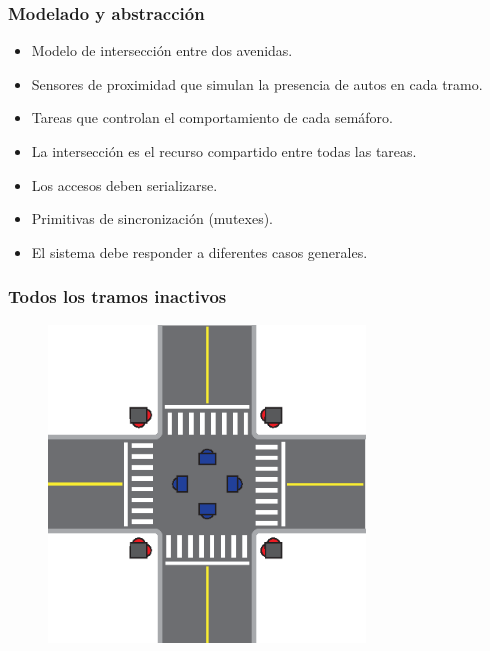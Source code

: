 \begin{frame}
\frametitle{Modelado y abstracción}
\begin{block}{}
	\begin{itemize}
		\item Modelo de intersección entre dos avenidas.
		\item Sensores de proximidad que simulan la presencia de autos en cada tramo.
		\item Tareas que controlan el comportamiento de cada semáforo.
		\item La intersección es el recurso compartido entre todas las tareas.
		\item Los accesos deben serializarse.
		\item Primitivas de sincronización (mutexes).
		\item El sistema debe responder a diferentes casos generales.
	\end{itemize}
\end{block}
\end{frame}

\begin{frame}
\frametitle{Todos los tramos inactivos}
	\begin{figure}[htbp]
		\centering
		\includegraphics[width=0.750\textwidth]{diagramas/ningun-activo.eps}
	\end{figure}
\end{frame}

